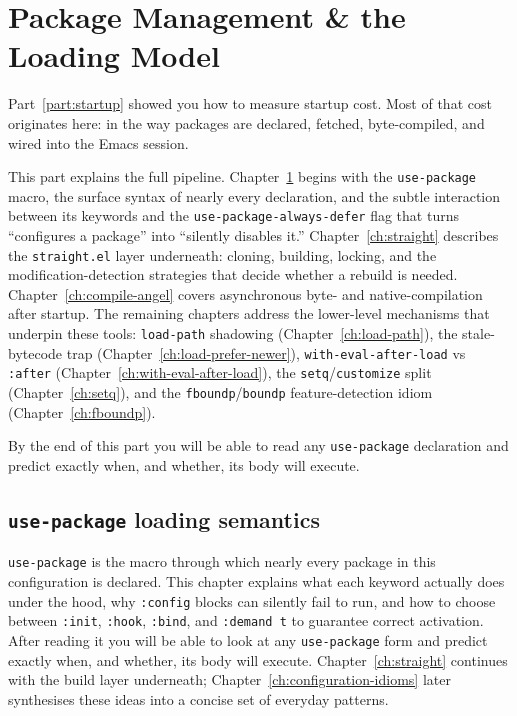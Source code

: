 \part{Package Management \& the Loading Model}
\label{part:packages}

Part~\ref{part:startup} showed you how to measure startup cost.
Most of that cost originates here: in the way packages are declared,
fetched, byte-compiled, and wired into the Emacs session.

This part explains the full pipeline.
Chapter~\ref{ch:use-package} begins with the \texttt{use-package}
macro, the surface syntax of nearly every declaration, and the
subtle interaction between its keywords and the
\texttt{use-package-always-defer} flag that turns ``configures a
package'' into ``silently disables it.''
Chapter~\ref{ch:straight} describes the \texttt{straight.el} layer
underneath: cloning, building, locking, and the modification-detection
strategies that decide whether a rebuild is needed.
Chapter~\ref{ch:compile-angel} covers asynchronous byte- and
native-compilation after startup.
The remaining chapters address the lower-level mechanisms that
underpin these tools: \texttt{load-path} shadowing
(Chapter~\ref{ch:load-path}), the stale-bytecode trap
(Chapter~\ref{ch:load-prefer-newer}), \texttt{with-eval-after-load}
vs \texttt{:after} (Chapter~\ref{ch:with-eval-after-load}), the
\texttt{setq}/\texttt{customize} split
(Chapter~\ref{ch:setq}), and the \texttt{fboundp}/\texttt{boundp}
feature-detection idiom (Chapter~\ref{ch:fboundp}).

By the end of this part you will be able to read any
\texttt{use-package} declaration and predict exactly when, and
whether, its body will execute.

\chapter{\texttt{use-package} loading semantics}
\label{ch:use-package}
\minitoc\label{use-package-loading-semantics}

\texttt{use-package} is the macro through which nearly every package
in this configuration is declared.  This chapter explains what each
keyword actually does under the hood, why \texttt{:config} blocks can
silently fail to run, and how to choose between \texttt{:init},
\texttt{:hook}, \texttt{:bind}, and \texttt{:demand~t} to guarantee
correct activation.  After reading it you will be able to look at any
\texttt{use-package} form and predict exactly when, and whether, its
body will execute.  Chapter~\ref{ch:straight} continues with the
build layer underneath; Chapter~\ref{ch:configuration-idioms}
later synthesises these ideas into a concise set of everyday patterns.

